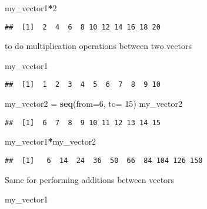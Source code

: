 \documentclass[
]{article}
\newenvironment{Shaded}{\begin{snugshade}}{\end{snugshade}}
\newcommand{\AttributeTok}[1]{\textcolor[rgb]{0.13,0.29,0.53}{#1}}
\newcommand{\DecValTok}[1]{\textcolor[rgb]{0.00,0.00,0.81}{#1}}
\newcommand{\FunctionTok}[1]{\textcolor[rgb]{0.13,0.29,0.53}{\textbf{#1}}}
\newcommand{\NormalTok}[1]{#1}
\newcommand{\OtherTok}[1]{\textcolor[rgb]{0.56,0.35,0.01}{#1}}
\newcommand{\SpecialCharTok}[1]{\textcolor[rgb]{0.81,0.36,0.00}{\textbf{#1}}}
\begin{document}
\begin{Shaded}
\begin{Highlighting}[]
\NormalTok{my\_vector1}\SpecialCharTok{*}\DecValTok{2}
\end{Highlighting}
\end{Shaded}

\begin{verbatim}
##  [1]  2  4  6  8 10 12 14 16 18 20
\end{verbatim}

to do multiplication operations between two vectors

\begin{Shaded}
\begin{Highlighting}[]
\NormalTok{my\_vector1}
\end{Highlighting}
\end{Shaded}

\begin{verbatim}
##  [1]  1  2  3  4  5  6  7  8  9 10
\end{verbatim}

\begin{Shaded}
\begin{Highlighting}[]
\NormalTok{my\_vector2 }\OtherTok{=} \FunctionTok{seq}\NormalTok{(}\AttributeTok{from=}\DecValTok{6}\NormalTok{, }\AttributeTok{to=} \DecValTok{15}\NormalTok{)}
\NormalTok{my\_vector2}
\end{Highlighting}
\end{Shaded}

\begin{verbatim}
##  [1]  6  7  8  9 10 11 12 13 14 15
\end{verbatim}

\begin{Shaded}
\begin{Highlighting}[]
\NormalTok{my\_vector1}\SpecialCharTok{*}\NormalTok{my\_vector2}
\end{Highlighting}
\end{Shaded}

\begin{verbatim}
##  [1]   6  14  24  36  50  66  84 104 126 150
\end{verbatim}

Same for performing additions between vectors

\begin{Shaded}
\begin{Highlighting}[]
\NormalTok{my\_vector1}
\end{Highlighting}
\end{Shaded}
\end{document}
